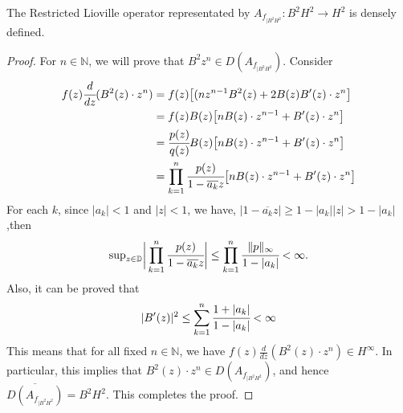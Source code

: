 \documentclass[10pt,a4paper]{amsart}
\begin{document}
\begin{proposition}
    The Restricted Lioville operator representated by $A_{f_{|B^2 H^2}}: B^2H^2\rightarrow H^2$ is densely defined.
\end{proposition}

\begin{proof}
    For $n\in \mathbb{N}$, we will prove that $B^2 z^n\in D(A_{f_{|B^2 H^2}})$. Consider
    \begin{align*}
   f(z) \cfrac{d}{dz}(B^2(z)\cdot z^n) &= f(z)\big[(nz^{n-1}B^2(z) + 2B(z)B'(z)\cdot z^n\big]\\  
    & = f(z)B(z)\big[nB(z)\cdot z^{n-1}+B'(z)\cdot z^n\big]\\
    &= \cfrac{p(z)}{q(z)}B(z)\big[nB(z)\cdot z^{n-1}+B'(z)\cdot z^n\big]\\
    &= \prod_{k=1}^{n}\cfrac{p(z)}{1-\overline{a_k}z}\big[nB(z)\cdot z^{n-1}+B'(z)\cdot z^n\big]  
    \end{align*}
For each $k$, since $|a_k|<1$ and $|z|<1$, we have,
$
|1-\overline{a_k}z|\geq 1-|a_k||z|> 1-|a_k|
$
,then $$\text{sup}_{z\in \mathbb{D}}\bigg| \prod_{k=1}^{n}\cfrac{p(z)}{1-\overline{a_k}z}\bigg|\leq \prod_{k=1}^{n}\cfrac{\|p\|_{\infty}}{1-|a_k|}<\infty.$$ 
Also, it can be proved that $$|B'(z)|^2\leq\sum_{k=1}^{n}\cfrac{1+|a_k|}{1-|a_k|}<\infty$$
This means that for all fixed $n\in \mathbb{N}$, we have $f(z) \frac{d}{dz}(B^2(z)\cdot z^n)\in H^{\infty}$. In particular, this implies that $B^2(z)\cdot z^n\in D(A_{f_{|B^2 H^2}})$, and hence $\overline{D(A_{f_{|B^2 H^2}})}=B^2H^2$. This completes the proof. 
\end{proof}
\end{document}
